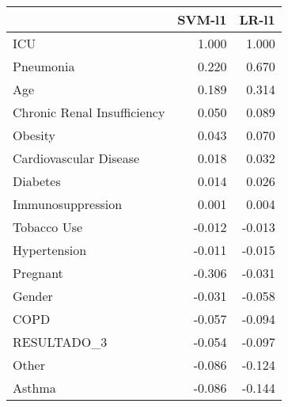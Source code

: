 \begin{tabular}{lrr}
\toprule
{} &  SVM-l1 &  LR-l1 \\
\midrule
ICU                         &   1.000 &  1.000 \\
Pneumonia                   &   0.220 &  0.670 \\
Age                         &   0.189 &  0.314 \\
Chronic Renal Insufficiency &   0.050 &  0.089 \\
Obesity                     &   0.043 &  0.070 \\
Cardiovascular Disease      &   0.018 &  0.032 \\
Diabetes                    &   0.014 &  0.026 \\
Immunosuppression           &   0.001 &  0.004 \\
Tobacco Use                 &  -0.012 & -0.013 \\
Hypertension                &  -0.011 & -0.015 \\
Pregnant                    &  -0.306 & -0.031 \\
Gender                      &  -0.031 & -0.058 \\
COPD                        &  -0.057 & -0.094 \\
RESULTADO\_3                 &  -0.054 & -0.097 \\
Other                       &  -0.086 & -0.124 \\
Asthma                      &  -0.086 & -0.144 \\
\bottomrule
\end{tabular}
